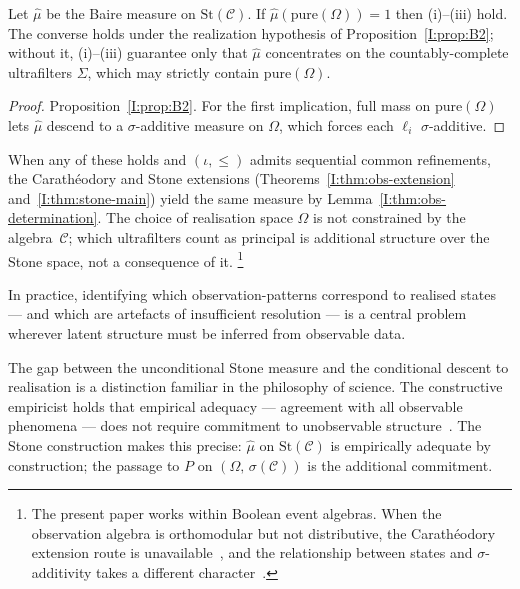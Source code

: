 \begin{corollary}
\label{I:cor:stone-support}
Let $\hat{\mu}$ be the Baire measure on $\mathrm{St}(\mathcal{C})$.  If
$\hat{\mu}(\mathrm{pure}(\Omega)) = 1$ then \textup{(i)--(iii)} hold.
The converse holds under the realization hypothesis of
Proposition~\ref{I:prop:B2}; without it, \textup{(i)--(iii)} guarantee
only that $\hat{\mu}$ concentrates on the countably-complete
ultrafilters $\Sigma$, which may strictly contain
$\mathrm{pure}(\Omega)$.
\end{corollary}

\begin{proof}
Proposition~\ref{I:prop:B2}.  For the first implication, full mass on
$\mathrm{pure}(\Omega)$ lets $\hat{\mu}$ descend to a $\sigma$-additive
measure on $\Omega$, which forces each $\ell_i$ $\sigma$-additive.
\end{proof}

\noindent When any of these holds and $(\iota, \leq)$ admits sequential
common refinements, the Carath\'{e}odory and Stone extensions
(Theorems~\ref{I:thm:obs-extension} and~\ref{I:thm:stone-main}) yield
the same measure by Lemma~\ref{I:thm:obs-determination}.
The choice of realisation space $\Omega$ is not constrained by the
algebra~$\mathcal{C}$; which ultrafilters count as principal is
additional structure over the Stone space, not a consequence of
it.%
\footnote{The present paper works within Boolean event algebras.
When the observation algebra is orthomodular but not distributive,
the Carath\'{e}odory extension route is
unavailable~\cite{PtakPulmannova1991}, and the relationship between
states and $\sigma$-additivity takes a different
character~\cite{Gleason1957}.}

In practice, identifying which observation-patterns correspond to
realised states --- and which are artefacts of insufficient resolution
--- is a central problem wherever latent structure must be inferred
from observable data.

The gap between the unconditional Stone measure and the conditional
descent to realisation is a distinction familiar in the philosophy of
science.  The constructive empiricist holds that empirical adequacy ---
agreement with all observable phenomena --- does not require commitment
to unobservable structure~\cite{vanFraassen1980}.  The Stone construction
makes this precise: $\hat{\mu}$ on $\mathrm{St}(\mathcal{C})$ is
empirically adequate by construction; the passage to $P$ on
$(\Omega,\,\sigma(\mathcal{C}))$ is the additional commitment.
\ifstandalone


\fi
